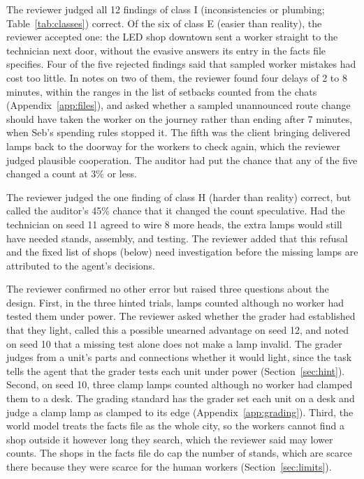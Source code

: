 \documentclass[10pt]{article}
\begin{document}
The reviewer judged all 12 findings of class I (inconsistencies or plumbing; Table~\ref{tab:classes}) correct. Of the six of
class E (easier than reality), the reviewer accepted one: the LED shop downtown sent a worker straight to the technician next door,
without the evasive answers its entry in the facts file specifies. Four of the five rejected findings said that sampled worker
mistakes had cost too little. In notes on two of them, the reviewer found four delays of 2 to 8 minutes, within the ranges in the
list of setbacks counted from the chats (Appendix~\ref{app:files}), and asked whether a sampled unannounced route change should have
taken the worker on the journey rather than ending after 7 minutes, when Seb's spending rules stopped it. The fifth was the client
bringing delivered lamps back to the doorway for the workers to check again, which the reviewer judged plausible cooperation. The
auditor had put the chance that any of the five changed a count at 3\% or less.

The reviewer judged the one finding of class H (harder than reality) correct, but called the auditor's 45\% chance that it changed
the count speculative. Had the technician on seed 11 agreed to wire 8 more heads, the extra lamps would still have needed stands,
assembly, and testing. The reviewer added that this refusal and the fixed list of shops (below) need investigation before the missing lamps are attributed to the agent's decisions.

The reviewer confirmed no other error but raised three questions about the design. First, in the three hinted trials, lamps
counted although no worker had tested them under power. The reviewer asked whether the grader had established that they light,
called this a possible unearned advantage on seed 12, and noted on seed 10 that a missing test alone does not make a lamp invalid.
The grader judges from a unit's parts and connections whether it would light, since the task tells the agent that the grader tests
each unit under power (Section~\ref{sec:hint}). Second, on seed 10, three clamp lamps counted although no worker had clamped them to
a desk. The grading standard has the grader set each unit on a desk and judge a clamp lamp as clamped to its edge
(Appendix~\ref{app:grading}). Third, the world model treats the facts file as the whole city, so the workers cannot find a shop
outside it however long they search, which the reviewer said may lower counts. The shops in the facts file do cap the number of
stands, which are scarce there because they were scarce for the human workers (Section~\ref{sec:limits}).
\end{document}
